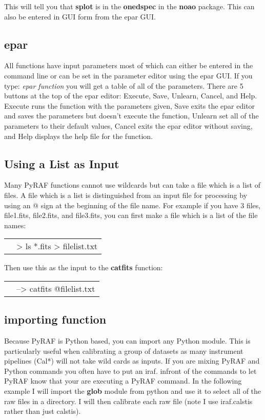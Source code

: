 This will tell you that {\bf splot} is in the {\bf onedspec} in the {\bf noao} package. This can also be entered in GUI form from the epar GUI. 

\subsection{epar}
All functions have input parameters most of which can either be entered in the command line or can be set in the parameter editor using the epar GUI. If you type: \emph{epar function} you will get a table of all of the parameters. There are 5 buttons at the top of the epar editor: Execute, Save, Unlearn, Cancel, and Help. Execute runs the function with the parameters given, Save exits the epar editor and saves the parameters but doesn't execute the function, Unlearn set all of the parameters to their default values, Cancel exits the epar editor without saving, and Help displays the help file for the function. 

\subsection{Using a List as Input}
Many PyRAF functions cannot use wildcards but can take a file which is a list of files. A file which is a list is distinguished from an input file for processing by using an @ sign at the beginning of the file name. For example if you have 3 files, file1.fits, file2.fits, and file3.fits, you can first make a file which is a list of the file names:

\begin{minipage}{4in}
\setlength{\oddsidemargin}{0.25 in}
\setlength{\evensidemargin}{0.25 in}
\begin{tabular}{ll}
& {\color{RoyalBlue}> ls *.fits > filelist.txt } \\
\end{tabular}


Then use this as the input to the {\bf catfits} function: \\
\begin{tabular}{ll}
& {\color{RoyalBlue}--> catfits @filelist.txt } \\
\end{tabular}
\end{minipage}


\subsection{importing function}
Because PyRAF is Python based, you can import any Python module. This is particularly useful when calibrating a group of datasets as many instrument pipelines (Cal*) will not take wild cards as inputs.  If you are mixing PyRAF and Python commands you often have to put an iraf. infront of the commands to let PyRAF know that your are executing a PyRAF command. In the following example I will import the {\bf glob} module from python and use it to select all of the raw files in a directory. I will then calibrate each raw file (note I use iraf.calstis rather than just calstis).


